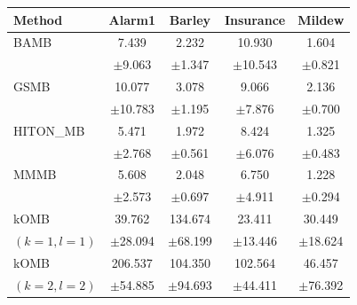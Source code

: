 \setlength{\tabcolsep}{5pt}
\begin{tabular}{lcccc}
\toprule
Method & Alarm1 & Barley & Insurance & Mildew \\
\midrule

BAMB
& 7.439 & 2.232 & 10.930 & 1.604 \\
& {\scriptsize $\pm$9.063} & {\scriptsize $\pm$1.347} & {\scriptsize $\pm$10.543} & {\scriptsize $\pm$0.821} \\

GSMB
& 10.077 & 3.078 & 9.066 & 2.136 \\
& {\scriptsize $\pm$10.783} & {\scriptsize $\pm$1.195} & {\scriptsize $\pm$7.876} & {\scriptsize $\pm$0.700} \\

HITON\_MB
& 5.471 & 1.972 & 8.424 & 1.325 \\
& {\scriptsize $\pm$2.768} & {\scriptsize $\pm$0.561} & {\scriptsize $\pm$6.076} & {\scriptsize $\pm$0.483} \\

MMMB
& 5.608 & 2.048 & 6.750 & 1.228 \\
& {\scriptsize $\pm$2.573} & {\scriptsize $\pm$0.697} & {\scriptsize $\pm$4.911} & {\scriptsize $\pm$0.294} \\

kOMB
& 39.762 & 134.674 & 23.411 & 30.449 \\
{\scriptsize $(k=1,l=1)$} & {\scriptsize $\pm$28.094} & {\scriptsize $\pm$68.199} & {\scriptsize $\pm$13.446} & {\scriptsize $\pm$18.624} \\

kOMB
& 206.537 & 104.350 & 102.564 & 46.457 \\
{\scriptsize $(k=2,l=2)$} & {\scriptsize $\pm$54.885} & {\scriptsize $\pm$94.693} & {\scriptsize $\pm$44.411} & {\scriptsize $\pm$76.392} \\
\bottomrule
\end{tabular}
